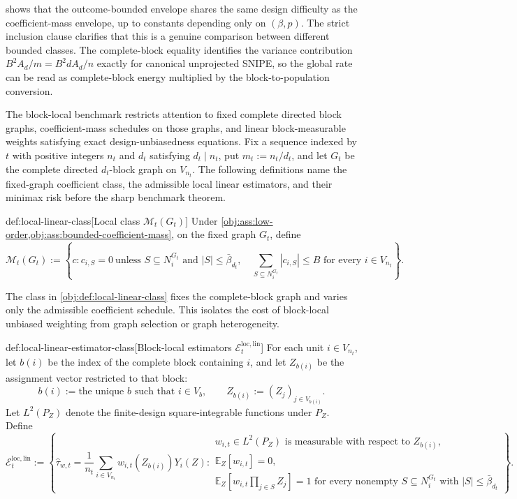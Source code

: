 shows that the outcome-bounded envelope shares the same design difficulty as the coefficient-mass envelope, up to constants depending only on \((\beta,p)\). The strict inclusion clause clarifies that this is a genuine comparison between different bounded classes. The complete-block equality identifies the variance contribution \(B^2A_d/m=B^2dA_d/n\) exactly for canonical unprojected SNIPE, so the global rate can be read as complete-block energy multiplied by the block-to-population conversion.

The block-local benchmark restricts attention to fixed complete directed block graphs, coefficient-mass schedules on those graphs, and linear block-measurable weights satisfying exact design-unbiasedness equations. Fix a sequence indexed by \(t\) with positive integers \(n_t\) and \(d_t\) satisfying \(d_t\mid n_t\), put \(m_t:=n_t/d_t\), and let \(G_t\) be the complete directed \(d_t\)-block graph on \(V_{n_t}\). The following definitions name the fixed-graph coefficient class, the admissible local linear estimators, and their minimax risk before the sharp benchmark theorem.

\begin{definitionv}{def:local-linear-class}[Local class \(\mathcal M_t(G_t)\)]
Under \cref{obj:ass:low-order,obj:ass:bounded-coefficient-mass}, on the fixed graph \(G_t\), define
\[
\mathcal M_t(G_t)
:=
\left\{
c:
c_{i,S}=0\ \text{unless } S\subseteq N_i^{G_t}\text{ and } |S|\le \bar\beta_{d_t},
\quad
\sum_{S\subseteq N_i^{G_t}} |c_{i,S}|\le B
\text{ for every } i\in V_{n_t}
\right\}.
\]
\end{definitionv}

The class in \cref{obj:def:local-linear-class} fixes the complete-block graph and varies only the admissible coefficient schedule. This isolates the cost of block-local unbiased weighting from graph selection or graph heterogeneity.

\begin{definitionv}{def:local-linear-estimator-class}[Block-local estimators $\mathcal E_t^{\mathrm{loc,lin}}$]
For each unit \(i\in V_{n_t}\), let \(b(i)\) be the index of the complete block containing \(i\), and let \(Z_{b(i)}\) be the assignment vector restricted to that block:
\[
b(i)
:=
\text{the unique } b \text{ such that } i\in V_b,
\qquad
Z_{b(i)}
:=
(Z_j)_{j\in V_{b(i)}}.
\]
Let \(L^2(P_Z)\) denote the finite-design square-integrable functions under \(P_Z\). Define
\[
\mathcal E_t^{\mathrm{loc,lin}}
:=
\left\{
\widehat\tau_{w,t}
=
\frac{1}{n_t}\sum_{i\in V_{n_t}} w_{i,t}(Z_{b(i)})Y_i(Z):
\begin{array}{l}
w_{i,t}\in L^2(P_Z)\text{ is measurable with respect to }Z_{b(i)},\\
\mathbb E_Z[w_{i,t}]=0,\\
\mathbb E_Z\left[w_{i,t}\prod_{j\in S}Z_j\right]=1
\text{ for every nonempty }S\subseteq N_i^{G_t}
\text{ with }|S|\le\bar\beta_{d_t}
\end{array}
\right\}.
\]
\end{definitionv}

